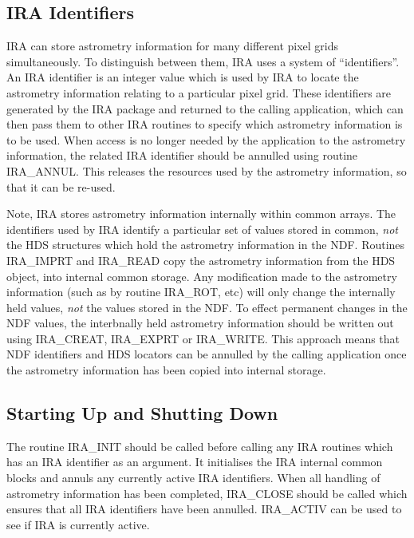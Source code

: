 \subsection{IRA Identifiers}
IRA can store astrometry information for many different pixel grids
simultaneously. To distinguish between them, IRA uses a system of
``identifiers''. An IRA identifier is an integer value which is used by IRA to
locate the astrometry information relating to a particular pixel grid. These
identifiers are generated by the IRA package and returned to the calling
application, which can then pass them to other IRA routines to specify which
astrometry information is to be used. When access is no longer needed by the
application to the astrometry information, the related IRA identifier should be
annulled using routine IRA\_ANNUL. This releases the resources used by the
astrometry information, so that it can be re-used. 

Note, IRA stores astrometry information internally within common arrays. The
identifiers used by IRA identify a particular set of values stored in common,
{\em not} the HDS structures which hold the astrometry information in the NDF.
Routines IRA\_IMPRT and IRA\_READ copy the astrometry information from the HDS
object, into internal common storage. Any modification made to the astrometry
information (such as by routine IRA\_ROT, etc) will only change the internally
held values, {\em not} the values stored in the NDF. To effect permanent changes
in the NDF values, the interbnally held astrometry information should be written
out using IRA\_CREAT, IRA\_EXPRT or IRA\_WRITE. This approach means that NDF
identifiers and HDS locators can be annulled by the calling application once the
astrometry information has been copied into internal storage. 

\subsection {Starting Up and Shutting Down}
The routine IRA\_INIT should be called before calling any IRA routines which has
an IRA identifier as an argument. It initialises the IRA internal common blocks
and annuls any currently active IRA identifiers. When all handling of
astrometry information has been completed, IRA\_CLOSE should be called which
ensures that all IRA identifiers have been annulled. IRA\_ACTIV can be used to 
see if IRA is currently active.

